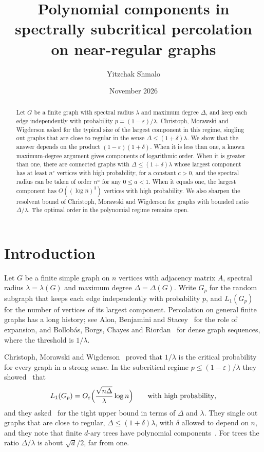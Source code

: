 \documentclass[11pt]{amsart}
\title[Subcritical components on near-regular graphs]{Polynomial components in spectrally subcritical percolation on
near-regular graphs}
\author{Yitzchak Shmalo}
\date{November 2026}
\theoremstyle{remark}
\begin{document}
\begin{abstract}
Let $G$ be a finite graph with spectral radius $\lambda$ and maximum degree $\Delta$, and keep each edge independently
with probability $p=(1-\varepsilon)/\lambda$. Christoph, Morawski and Wigderson asked for the typical size of the largest
component in this regime, singling out graphs that are close to regular in the sense $\Delta\le(1+\delta)\lambda$. We
show that the answer depends on the product $(1-\varepsilon)(1+\delta)$. When it is less than one, a known
maximum-degree argument gives components of logarithmic order. When it is greater than one, there are connected graphs
with $\Delta\le(1+\delta)\lambda$ whose largest component has at least $n^c$ vertices with high probability, for a
constant $c>0$, and the spectral radius can be taken of order $n^a$ for any $0\le a<1$. When it equals one, the largest
component has $O((\log n)^3)$ vertices with high probability. We also sharpen the resolvent bound of Christoph, Morawski
and Wigderson for graphs with bounded ratio $\Delta/\lambda$. The optimal order in the polynomial regime remains open.
\end{abstract}
\maketitle

\section{Introduction}\label{sec:intro}

Let $G$ be a finite simple graph on $n$ vertices with adjacency matrix $A$, spectral radius $\lambda=\lambda(G)$ and
maximum degree $\Delta=\Delta(G)$. Write $G_p$ for the random subgraph that keeps each edge independently with
probability $p$, and $L_1(G_p)$ for the number of vertices of its largest component. Percolation on general finite
graphs has a long history; see Alon, Benjamini and Stacey~\cite{ABS04} for the role of expansion, and
Bollobás, Borgs, Chayes and Riordan~\cite{BBCR10} for dense graph sequences, where the threshold is $1/\lambda$.

Christoph, Morawski and Wigderson~\cite{CMW26} proved that $1/\lambda$ is the critical probability for every graph in a
strong sense. In the subcritical regime $p\le(1-\varepsilon)/\lambda$ they showed~\cite[Theorem~1.4]{CMW26} that
\begin{equation}\label{eq:cmw}
L_1(G_p)=O_\varepsilon\Bigl(\frac{\sqrt{n\Delta}}{\lambda}\log n\Bigr)\qquad\text{with high probability},
\end{equation}
and they asked~\cite[Question~5.2]{CMW26} for the tight upper bound in terms of $\Delta$ and $\lambda$. They single out
graphs that are close to regular, $\Delta\le(1+\delta)\lambda$, with $\delta$ allowed to depend on $n$, and they note
that finite $d$-ary trees have polynomial components~\cite[p.~20, footnote~7]{CMW26}. For trees the ratio
$\Delta/\lambda$ is about $\sqrt d/2$, far from one.
\end{document}
